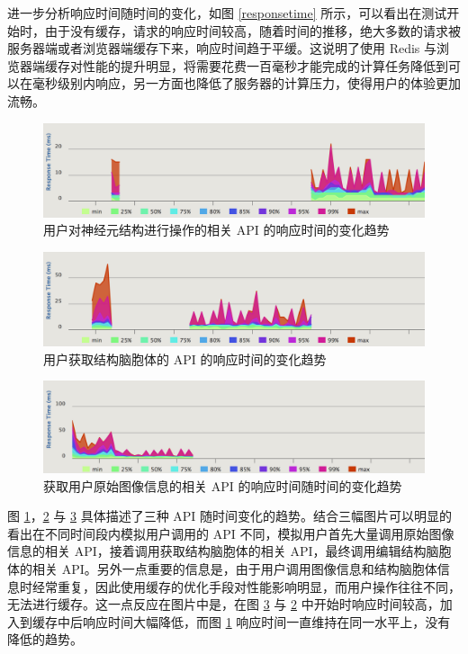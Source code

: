 进一步分析响应时间随时间的变化，如图 \ref{responsetime} 所示，可以看出在测试开始时，由于没有缓存，请求的响应时间较高，随着时间的推移，绝大多数的请求被服务器端或者浏览器端缓存下来，响应时间趋于平缓。这说明了使用 Redis 与浏览器端缓存对性能的提升明显，将需要花费一百毫秒才能完成的计算任务降低到可以在毫秒级别内响应，另一方面也降低了服务器的计算压力，使得用户的体验更加流畅。

\begin{figure}[!ht]
\centering
\includegraphics[width=148mm]{images/operation-res}
\caption{用户对神经元结构进行操作的相关 API 的响应时间的变化趋势}
\label{operation-res}
\end{figure}

\begin{figure}[!ht]
\centering
\includegraphics[width=148mm]{images/swc-c-res}
\caption{用户获取结构脑胞体的 API 的响应时间的变化趋势}
\label{swc-c-res}
\end{figure}

\begin{figure}[!ht]
\centering
\includegraphics[width=148mm]{images/image-res}
\caption{获取用户原始图像信息的相关 API 的响应时间随时间的变化趋势}
\label{image-res}
\end{figure}

图 \ref{operation-res}，\ref{swc-c-res} 与 \ref{image-res} 具体描述了三种 API 随时间变化的趋势。结合三幅图片可以明显的看出在不同时间段内模拟用户调用的 API 不同，模拟用户首先大量调用原始图像信息的相关 API，接着调用获取结构脑胞体的相关 API，最终调用编辑结构脑胞体的相关 API。另外一点重要的信息是，由于用户调用图像信息和结构脑胞体信息时经常重复，因此使用缓存的优化手段对性能影响明显，而用户操作往往不同，无法进行缓存。这一点反应在图片中是，在图 \ref{image-res} 与 \ref{swc-c-res} 中开始时响应时间较高，加入到缓存中后响应时间大幅降低，而图 \ref{operation-res} 响应时间一直维持在同一水平上，没有降低的趋势。


